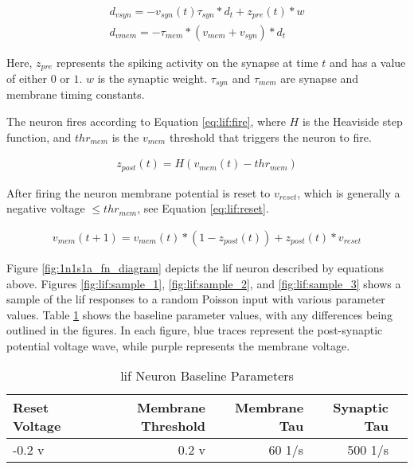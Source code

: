 \begin{align}
d_{vsyn} = -v_{syn}(t) \tau_{syn} * d_t + z_{pre}(t) * w \label{eq:lif:psp} \\
d_{vmem} = -\tau_{mem} * (v_{mem} + v_{syn}) * d_t \label{eq:lif:v}
\end{align}

Here, $z_{pre}$ represents the spiking activity on the synapse at time
$t$ and has a value of either $0$ or $1$. $w$ is the synaptic
weight. $\tau_{syn}$ and $\tau_{mem}$ are synapse and membrane timing
constants.

The neuron fires according to Equation \ref{eq:lif:fire}, where $H$ is the
Heaviside step function, and $thr_{mem}$ is the $v_{mem}$ threshold that
triggers the neuron to fire.

\begin{align}
z_{post}(t) = H(v_{mem}(t) - thr_{mem}) \label{eq:lif:fire}
\end{align}

After firing the neuron membrane potential is reset to $v_{reset}$, which is
generally a negative voltage $\leq thr_{mem}$, see Equation \ref{eq:lif:reset}.

\begin{align}
v_{mem}(t+1) = v_{mem}(t) * (1 - z_{post}(t)) + z_{post}(t) * v_{reset} \label{eq:lif:reset}
\end{align}

Figure \ref{fig:1n1s1a_fn_diagram} depicts the \Gls{lif} neuron described by
equations above. Figures \ref{fig:lif:sample_1}, \ref{fig:lif:sample_2}, and
\ref{fig:lif:sample_3} shows a sample of the \Gls{lif} responses to a random
Poisson input with various parameter values. Table \ref{table:lif_params} shows
the baseline parameter values, with any differences being outlined in the
figures. In each figure, blue traces represent the post-synaptic potential
voltage wave, while purple represents the membrane voltage.

\begin{table}[!htp]\centering
  \caption{\Gls{lif} Neuron Baseline Parameters} \label{table:lif_params}
  \scriptsize
  \begin{tabular}{lrrrr}\toprule
    Reset Voltage &Membrane Threshold &Membrane Tau &Synaptic Tau \\\midrule
    -0.2 v &0.2 v &60 1/s &500 1/s \\
    \bottomrule
  \end{tabular}
\end{table}

